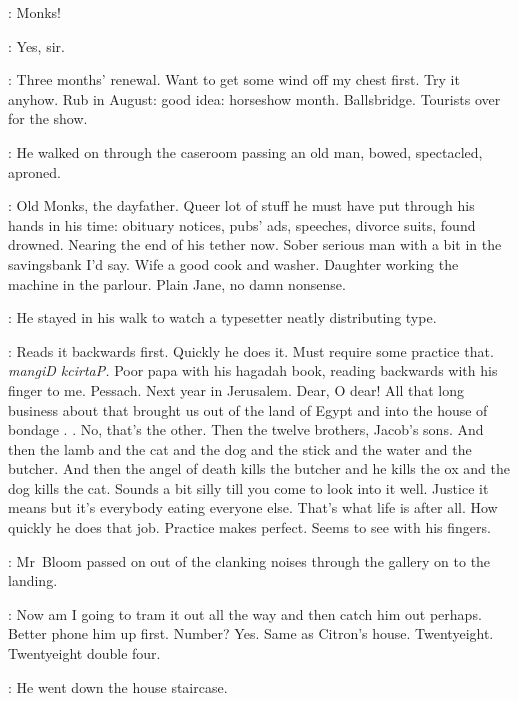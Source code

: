 \foreman:
Monks!%

\voice:
Yes, sir.

\BloomInt:
Three months' renewal.
Want to get some wind off my chest first.
Try it anyhow.
Rub in August:
good idea: horseshow month.
Ballsbridge.
Tourists over for the show.



:
He walked on through the caseroom
passing an old man, bowed, spectacled, aproned.

\BloomInt:
Old Monks, the dayfather.
Queer lot of stuff he must have put through his hands in his time:
obituary notices, pubs' ads, speeches, divorce suits, found drowned.
Nearing the end of his tether now.
Sober serious man with a bit in the savingsbank I'd say.
Wife a good cook and washer.
Daughter working the machine in the parlour.
Plain Jane, no damn nonsense.



:
He stayed in his walk to watch a typesetter
neatly distributing type.

\BloomInt:
Reads it backwards first.
Quickly he does it.
Must require some practice that.
\emph{mangiD kcirtaP.}
Poor papa with his hagadah book,
reading backwards with his finger to me.
Pessach.
Next year in Jerusalem.
Dear, O dear!
All that long business about that brought us out of the land of Egypt
and into the house of bondage .
.
No, that's the other.
Then the twelve brothers, Jacob's sons.
And then the lamb and the cat and the dog
and the stick and the water and the butcher.
And then the angel of death kills the butcher
and he kills the ox and the dog kills the cat.
Sounds a bit silly till you come to look into it well.
Justice it means
but it's everybody eating everyone else.
That's what life is after all.
How quickly he does that job.
Practice makes perfect.
Seems to see with his fingers.

:
Mr~Bloom passed on out of the clanking noises
through the gallery on to the landing.

\BloomInt:
Now am I going to tram it out all the way and then catch him out perhaps.
Better phone him up first.
Number?
Yes.
Same as Citron's house.
Twentyeight.
Twentyeight double four.



:
He went down the house staircase.

